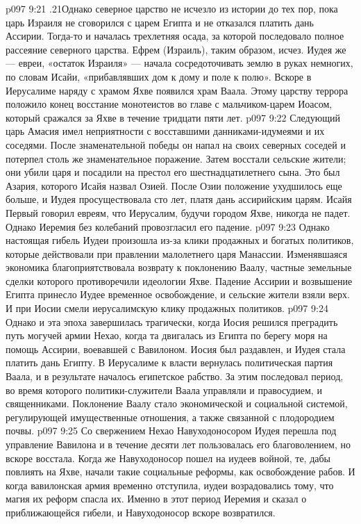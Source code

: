 \vs p097 9:21 .21Однако северное царство не исчезло из истории до тех пор, пока царь Израиля не сговорился с царем Египта и не отказался платить дань Ассирии. Тогда\hyp{}то и началась трехлетняя осада, за которой последовало полное рассеяние северного царства. Ефрем (Израиль), таким образом, исчез. Иудея же --- евреи, «остаток Израиля» --- начала сосредоточивать землю в руках немногих, по словам Исайи, «прибавлявших дом к дому и поле к полю». Вскоре в Иерусалиме наряду с храмом Яхве появился храм Ваала. Этому царству террора положило конец восстание монотеистов во главе с мальчиком\hyp{}царем Иоасом, который сражался за Яхве в течение тридцати пяти лет.
\vs p097 9:22 Следующий царь Амасия имел неприятности с восставшими данниками\hyp{}идумеями и их соседями. После знаменательной победы он напал на своих северных соседей и потерпел столь же знаменательное поражение. Затем восстали сельские жители; они убили царя и посадили на престол его шестнадцатилетнего сына. Это был Азария, которого Исайя назвал Озией. После Озии положение ухудшилось еще больше, и Иудея просуществовала сто лет, платя дань ассирийским царям. Исайя Первый говорил евреям, что Иерусалим, будучи городом Яхве, никогда не падет. Однако Иеремия без колебаний провозгласил его падение.
\vs p097 9:23 \pc Однако настоящая гибель Иудеи произошла из\hyp{}за клики продажных и богатых политиков, которые действовали при правлении малолетнего царя Манассии. Изменявшаяся экономика благоприятствовала возврату к поклонению Ваалу, частные земельные сделки которого противоречили идеологии Яхве. Падение Ассирии и возвышение Египта принесло Иудее временное освобождение, и сельские жители взяли верх. И при Иосии смели иерусалимскую клику продажных политиков.
\vs p097 9:24 Однако и эта эпоха завершилась трагически, когда Иосия решился преградить путь могучей армии Нехао, когда та двигалась из Египта по берегу моря на помощь Ассирии, воевавшей с Вавилоном. Иосия был раздавлен, и Иудея стала платить дань Египту. В Иерусалиме к власти вернулась политическая партия Ваала, и в результате началось  египетское рабство. За этим последовал период, во время которого политики\hyp{}служители Ваала управляли и правосудием, и священниками. Поклонение Ваалу стало экономической и социальной системой, регулирующей имущественные отношения, а также связанной с плодородием почвы.
\vs p097 9:25 Со свержением Нехао Навуходоносором Иудея перешла под управление Вавилона и в течение десяти лет пользовалась его благоволением, но вскоре восстала. Когда же Навуходоносор пошел на иудеев войной, те, дабы повлиять на Яхве, начали такие социальные реформы, как освобождение рабов. И когда вавилонская армия временно отступила, иудеи возрадовались тому, что магия их реформ спасла их. Именно в этот период Иеремия и сказал о приближающейся гибели, и Навуходоносор вскоре возвратился.
